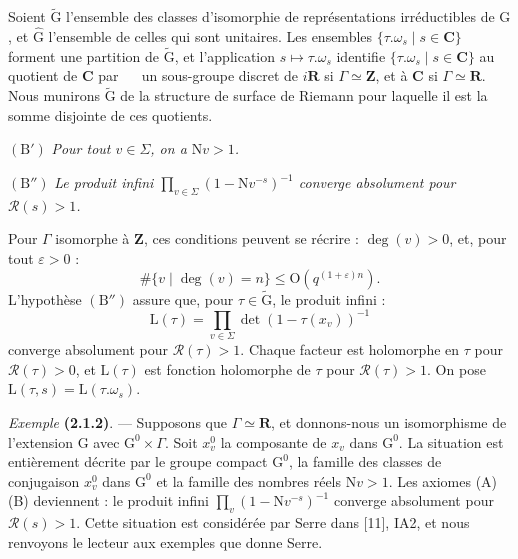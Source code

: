 \documentclass[11pt,leqno]{article}
\newcommand{\Page}[1]{\ifvmode\noindent\else\unskip\ \fi{\footnotesize\textcolor{gray}{[p.\,#1]}}\ \ignorespaces}
\begin{document}
Soient \(\widetilde{\mathrm{G}}\) l’ensemble des classes d’isomorphie de représentations irréductibles de \(\mathrm{G}\), et \(\widehat{\mathrm{G}}\) l’ensemble de celles qui sont unitaires. Les ensembles \(\{\tau.\omega_s\mid s\in\mathbf{C}\}\) forment une partition de \(\widetilde{\mathrm{G}}\), et l’application \(s\mapsto\tau.\omega_s\) identifie \(\{\tau.\omega_s\mid s\in\mathbf{C}\}\) au quotient de \(\mathbf{C}\) par
\Page{188}
un sous-groupe discret de \(i\mathbf{R}\) si \(\Gamma\simeq\mathbf{Z}\), et à \(\mathbf{C}\) si \(\Gamma\simeq\mathbf{R}\). Nous munirons \(\widetilde{\mathrm{G}}\) de la structure de surface de Riemann pour laquelle il est la somme disjointe de ces quotients.

\((\mathrm{B}')\) \textit{Pour tout \(v\in\Sigma\), on a \(\mathrm{N}v>1\).}

\((\mathrm{B}'')\) \textit{Le produit infini \(\displaystyle\prod_{v\in\Sigma}(1-\mathrm{N}v^{-s})^{-1}\) converge absolument pour \(\mathscr{R}(s)>1\).}

Pour \(\Gamma\) isomorphe à \(\mathbf{Z}\), ces conditions peuvent se récrire : \(\deg(v)>0\), et, pour tout \(\varepsilon>0\) :
\[
\#\{v\mid\deg(v)=n\}\leq\mathrm{O}(q^{(1+\varepsilon)n}).
\]
L’hypothèse \((\mathrm{B}'')\) assure que, pour \(\tau\in\widetilde{\mathrm{G}}\), le produit infini :
\[
\mathrm{L}(\tau)=\prod_{v\in\Sigma}\det(1-\tau(x_v))^{-1}
\]
converge absolument pour \(\mathscr{R}(\tau)>1\). Chaque facteur est holomorphe en \(\tau\) pour \(\mathscr{R}(\tau)>0\), et \(\mathrm{L}(\tau)\) est fonction holomorphe de \(\tau\) pour \(\mathscr{R}(\tau)>1\). On pose \(\mathrm{L}(\tau,s)=\mathrm{L}(\tau.\omega_s)\).

\textit{Exemple} \textbf{(2.1.2)}. — Supposons que \(\Gamma\simeq\mathbf{R}\), et donnons-nous un isomorphisme de l’extension \(\mathrm{G}\) avec \(\mathrm{G}^0\times\Gamma\). Soit \(x_v^0\) la composante de \(x_v\) dans \(\mathrm{G}^0\). La situation est entièrement décrite par le groupe compact \(\mathrm{G}^0\), la famille des classes de conjugaison \(x_v^0\) dans \(\mathrm{G}^0\) et la famille des nombres réels \(\mathrm{N}v>1\). Les axiomes (A) (B) deviennent : le produit infini \(\displaystyle\prod_v(1-\mathrm{N}v^{-s})^{-1}\) converge absolument pour \(\mathscr{R}(s)>1\). Cette situation est considérée par Serre dans [11], IA2, et nous renvoyons le lecteur aux exemples que donne Serre.
\end{document}

